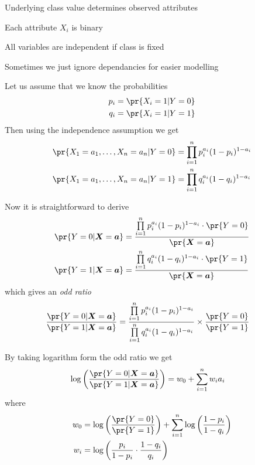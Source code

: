 \documentclass[landscape,footrule]{foils}
\renewcommand{\vec}[1]{\boldsymbol{#1}}
\begin{document}




Underlying class value determines observed attributes 
\begin{triangles}
\item Each attribute $X_i$ is binary 
\item All variables are independent if class is fixed
\item Sometimes we just ignore dependancies for easier modelling
\end{triangles}


Let us assume that we know the probabilities
\begin{align*}
p_i&=\pr{X_i=1|Y=0}\\
q_i&=\pr{X_i=1|Y=1}
\end{align*}
Then using the independence assumption we get
\begin{align*}
\pr{X_1=a_1,\ldots,X_n=a_n|Y=0}&=\prod_{i=1}^np_i^{a_i}(1-p_i)^{1-a_i}\\
\pr{X_1=a_1,\ldots,X_n=a_n|Y=1}&=\prod_{i=1}^nq_i^{a_i}(1-q_i)^{1-a_i}
\end{align*}


\enlargethispage{1.5cm}
Now it is straightforward to derive
\begin{align*}
\pr{Y=0|\vec{X}=\vec{a}}&= \frac{\prod\limits_{i=1}^np_i^{a_i}(1-p_i)^{1-a_i}\cdot\pr{Y=0}}{\pr{\vec{X}=\vec{a}}}\\
\pr{Y=1|\vec{X}=\vec{a}}&= \frac{\prod\limits_{i=1}^nq_i^{a_i}(1-q_i)^{1-a_i}\cdot\pr{Y=1}}{\pr{\vec{X}=\vec{a}}}
\end{align*}
which gives an \emph{odd ratio} 
\begin{align*}
\frac{\pr{Y=0|\vec{X}=\vec{a}}}{\pr{Y=1|\vec{X}=\vec{a}}}&=\frac{\prod\limits_{i=1}^np_i^{a_i}(1-p_i)^{1-a_i}}{\prod\limits_{i=1}^nq_i^{a_i}(1-q_i)^{1-a_i}}
\times \frac{\pr{Y=0}}{\pr{Y=1}}
\end{align*} 
 
 
By taking logarithm form the odd ratio we get
\begin{align*}
\log\left(\frac{\pr{Y=0|\vec{X}=\vec{a}}}{\pr{Y=1|\vec{X}=\vec{a}}}\right)&= w_0+\sum_{i=1}^n w_ia_i
\end{align*} 
where 
\begin{align*}
w_0&=\log\left(\frac{\pr{Y=0}}{\pr{Y=1}}\right)+\sum_{i=1}^n\log\left(\frac{1-p_i}{1-q_i}\right)\\
w_i&=\log \left(\frac{p_i}{1-p_i}\cdot\frac{1-q_i}{q_i}\right) 
\end{align*}
\end{document}
